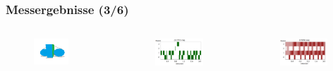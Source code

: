 \documentclass{beamer}
\begin{document}
\begin{frame}
	\frametitle{Messergebnisse (3/6)}
	\begin{columns}
		\begin{figure}
			\includegraphics[width=0.68\textwidth]{img/type2.png} \pause
		\end{figure}
		\begin{figure}
			\includegraphics[width=0.9\textwidth]{img/hum22.png}
		\end{figure}
		\begin{figure}
			\includegraphics[width=0.9\textwidth]{img/ki2.png} 

\end{figure}
\end{columns}
\end{frame}
\end{document}
